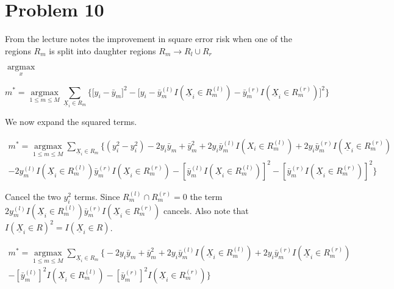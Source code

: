 \documentclass[11pt]{article}
\begin{document}
\section*{Problem 10}
\setlength{\parindent}{0pt}

From the lecture notes the improvement in square error risk when one of the 
regions $R_m$ is split into daughter regions $R_m \to R_l \cup R_r$

$\underset{x}{\operatorname{argmax}}$

\begin{equation}
m^* = \underset{1 \leq m \leq M}{\operatorname{argmax}} 
\sum_{\underline{X}_i \in R_m} \Bigg\{\Big[y_i-\bar{y}_m\Big]^2-
\Big[y_i - \bar{y}_m^{(l)}I(\underline{X}_i \in R_m^{(l)})-
\bar{y}_m^{(r)}I(\underline{X}_i \in R_m^{(r)})\Big]^2\Bigg\}
\end{equation}

We now expand the squared terms. 

\begin{equation}
\begin{split}
m^* = \underset{1 \leq m \leq M}{\operatorname{argmax}} 
\sum_{\underline{X}_i \in R_m} \Bigg\{(y_i^2-y_i^2) -2y_i\bar{y}_m + \bar{y}_m^2 
+2y_i\bar{y}_m^{(l)}I(X_i \in R_m^{(l)}) 
+2y_i\bar{y}_m^{(r)}I(\underline{X}_i \in R_m^{(r)}) \\
- 2y_m^{(l)}I(\underline{X}_i \in R_m^{(l)})\bar{y}_m^{(r)}I(\underline{X}_i 
\in R_m^{(r)})-[\bar{y}_m^{(l)}I(\underline{X}_i 
\in R_m^{(l)})]^2-[\bar{y}_m^{(r)}I(\underline{X}_i \in R_m^{(r)})]^2\Bigg\}
\end{split}
\end{equation}

Cancel the two $y_i^2$ terms. Since $R_m^{(l)} \cap R_m^{(r)} = 0$ the term  
$2y_m^{(l)}I(\underline{X}_i 
\in R_m^{(l)})\bar{y}_m^{(r)}I(\underline{X}_i \in R_m^{(r)})$ 
cancels. Also note that $I(\underline{X}_i \in R)^2 = I(\underline{X}_i \in R)$.

\begin{equation}
\begin{split}
m^* = \underset{1 \leq m \leq M}{\operatorname{argmax}} 
\sum_{\underline{X}_i \in R_m} \Bigg\{-2y_i\bar{y}_m + \bar{y}_m^2 + 
2y_i\bar{y}_m^{(l)}I(\underline{X}_i \in R_m^{(l)}) + 
2y_i\bar{y}_m^{(r)}I(\underline{X}_i \in R_m^{(r)})\\ 
- [\bar{y}_m^{(l)}]^2I(\underline{X}_i \in R_m^{(l)}) - 
[\bar{y}_m^{(r)}]^2I(\underline{X}_i \in R_m^{(r)})\Bigg\}
\end{split}
\end{equation}
\end{document}
